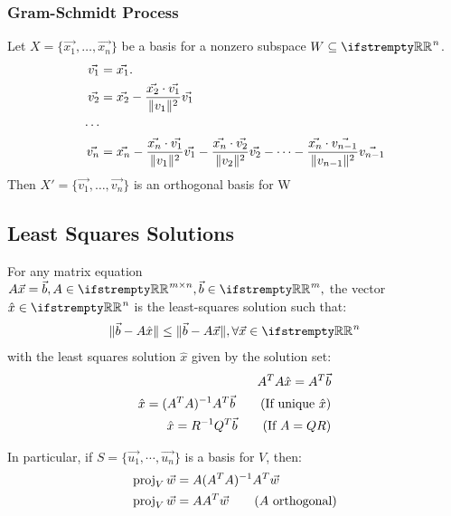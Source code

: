 \documentclass[12pt, a4paper]{article}
\begin{document}
\begin{multicols*}{3}
\subsubsection{Gram-Schmidt Process}
Let $X = \{\vec{x_1},\ldots,\vec{x_n}\}$ be a basis for a nonzero subspace $W \subseteq \RR^n$.
\begin{align*}
  \vec{v_1} &= \vec{x_1}. \\
  \vec{v_2} &= \vec{x_2} - \frac{\vec{x_2}\cdot\vec{v_1}}{\lVert v_1\rVert^2}\vec{v_1} \\
  \cdots \\
  \vec{v_n} &= \vec{x_n} - \frac{\vec{x_n}\cdot\vec{v_1}}{\lVert v_1\rVert^2}\vec{v_1} - \frac{\vec{x_n}\cdot\vec{v_2}}{\lVert v_2\rVert^2}\vec{v_2} - \cdots -  \frac{\vec{x_n}\cdot\vec{v_{n-1}}}{\lVert v_{n-1}\rVert^2}\vec{v_{n-1}}    
\end{align*}
Then $X' = \{\vec{v_1},\ldots,\vec{v_n}\}$ is an orthogonal basis for W

\subsection{Least Squares Solutions}
For any matrix equation $A\vec{x} = \vec{b}, A \in \RR^{m{\times}n}, \vec{b} \in \RR^m,$ the vector $\hat{x} \in \RR^n$ is the least-squares solution such that:
\begin{align*}
  \norm{\vec{b} - A\hat{x}} \leq \norm{\vec{b} - A\vec{x}}, \forall \vec{x} \in \RR^n
\end{align*}
with the least squares solution $\hat{x}$ given by the solution set:
\begin{align*}
  A^TA\hat{x} = A^T\vec{b}\\
  \hat{x} = (A^TA)^{-1}A^T \vec{b}\tag*{(If unique $\hat{x}$)}\\
  \hat{x} = R^{-1}Q^T \vec{b}\tag*{(If $A=QR$)}
\end{align*}

In particular, if $S = \{\vec{u_1},\cdots,\vec{u_n}\}$ is a basis for $V$, then:
\begin{align*}
  \operatorname{proj}_V \vec{w} &= A(A^TA)^{-1}A^T \vec{w}\\
  \operatorname{proj}_V \vec{w} &= AA^T \vec{w}\tag*{($A$ orthogonal)}
\end{align*}


\end{multicols*}
\end{document}
